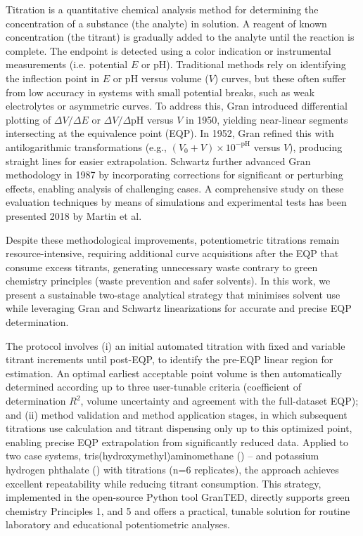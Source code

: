 \documentclass[twoside,twocolumn,9pt]{article}
\begin{document}
{Titration is a quantitative chemical analysis method for determining the concentration of a substance (the analyte) in solution. A reagent of known concentration (the titrant) is gradually added to the analyte until the reaction is complete. The endpoint is detected using a color indication or instrumental measurements (i.e. potential $E$ or pH). Traditional methods rely on identifying the inflection point in $E$ or pH versus volume ($V$) curves, but these often suffer from low accuracy in systems with small potential breaks, such as weak electrolytes or asymmetric curves. To address this, Gran introduced differential plotting of $\Delta V/\Delta E$ or $\Delta V/\Delta\mathrm{pH}$ versus $V$ in 1950,\cite{Gran1950} yielding near-linear segments intersecting at the equivalence point (EQP). In 1952, Gran refined this with antilogarithmic transformations (e.g., $(V_0 + V) \times 10^{-\mathrm{pH}}$ versus $V$),\cite{Gran1952} producing straight lines for easier extrapolation. Schwartz further advanced Gran methodology in 1987 by incorporating corrections for significant \ce{[H+]} or \ce{[OH-]} perturbing effects, enabling analysis of challenging cases.\cite{Schwartz1987} A comprehensive study on these evaluation techniques by means of simulations and experimental tests has been presented 2018 by Martin et al.\cite{Martin}

Despite these methodological improvements, potentiometric titrations remain resource-intensive, requiring additional curve acquisitions after the EQP that consume excess titrants, generating unnecessary waste contrary to green chemistry principles (waste prevention and safer solvents).\cite{Anastas1998} In this work, we present a sustainable two-stage analytical strategy that minimises solvent use while leveraging Gran and Schwartz linearizations for accurate and precise EQP determination.

The protocol involves (i) an initial automated titration with fixed and variable titrant increments until post-EQP, to identify the pre-EQP linear region for estimation. An optimal earliest acceptable point volume is then automatically determined according up to three user-tunable criteria (coefficient of determination $R^2$, volume uncertainty and agreement with the full-dataset EQP); and (ii) method validation and method application stages, in which subsequent titrations use calculation and titrant dispensing only up to this optimized point, enabling precise EQP extrapolation from significantly reduced data. Applied to two case systems, tris(hydroxymethyl)aminomethane () -- and potassium hydrogen phthalate () with   titrations (n=6 replicates), the approach achieves excellent repeatability while reducing titrant consumption. This strategy, implemented in the open-source Python tool GranTED, directly supports green chemistry Principles 1, and 5 and offers a practical, tunable solution for routine laboratory and educational potentiometric analyses.

}
\end{document}
